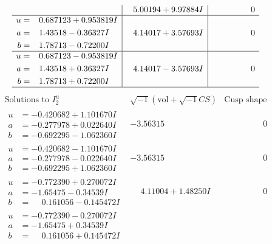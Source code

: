 \documentclass[1p]{elsarticle_modified}
\theoremstyle{definition}
\newcommand{\I}{\sqrt{-1}}
\begin{document}
$$\begin{array}{c|c|c}
 & \phantom{-}5.00194 + 9.97884 I & \phantom{-0.000000 } 0 \\ \hline\begin{aligned}
u &= \phantom{-}0.687123 + 0.953819 I \\
a &= \phantom{-}1.43518 - 0.36327 I \\
b &= \phantom{-}1.78713 - 0.72200 I\end{aligned}
 & \phantom{-}4.14017 + 3.57693 I & \phantom{-0.000000 } 0 \\ \hline\begin{aligned}
u &= \phantom{-}0.687123 - 0.953819 I \\
a &= \phantom{-}1.43518 + 0.36327 I \\
b &= \phantom{-}1.78713 + 0.72200 I\end{aligned}
 & \phantom{-}4.14017 - 3.57693 I & \phantom{-0.000000 } 0\\
 \hline 
 \end{array}$$\newpage$$\begin{array}{c|c|c}  
\text{Solutions to }I^u_{2}& \I (\text{vol} + \sqrt{-1}CS) & \text{Cusp shape}\\
 \hline 
\begin{aligned}
u &= -0.420682 + 1.101670 I \\
a &= -0.277978 + 0.022640 I \\
b &= -0.692295 - 1.062360 I\end{aligned}
 & -3.56315\phantom{ +0.000000I} & \phantom{-0.000000 } 0 \\ \hline\begin{aligned}
u &= -0.420682 - 1.101670 I \\
a &= -0.277978 - 0.022640 I \\
b &= -0.692295 + 1.062360 I\end{aligned}
 & -3.56315\phantom{ +0.000000I} & \phantom{-0.000000 } 0 \\ \hline\begin{aligned}
u &= -0.772390 + 0.270072 I \\
a &= -1.65475 - 0.34539 I \\
b &= \phantom{-}0.161056 - 0.145472 I\end{aligned}
 & \phantom{-}4.11004 + 1.48250 I & \phantom{-0.000000 } 0 \\ \hline\begin{aligned}
u &= -0.772390 - 0.270072 I \\
a &= -1.65475 + 0.34539 I \\
b &= \phantom{-}0.161056 + 0.145472 I\end{aligned}

\end{array}$$
\end{document}
